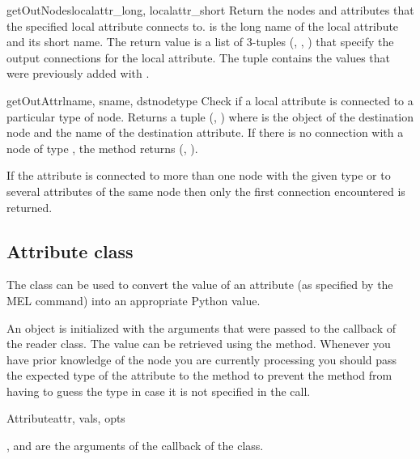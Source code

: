\begin{methoddesc}{getOutNodes}{localattr_long, localattr_short}
Return the nodes and attributes that the specified local attribute
connects to.  is the long name of the local
attribute and  its short name.
The return value is a list of 3-tuples (, , 
) that specify the output connections for the
local attribute. The tuple contains the values that were previously
added with .
\end{methoddesc}

\begin{methoddesc}{getOutAttr}{lname, sname, dstnodetype}
Check if a local attribute is connected to a particular type of node.
Returns a tuple (, ) where  is the
 object of the destination node and  the name of 
the destination attribute. If there is no connection with a node of
type , the method returns (, ).

If the attribute is connected to more than one node with the given
type or to several attributes of the same node then only the first
connection encountered is returned.
\end{methoddesc}

\subsection{Attribute class}

The  class can be used to convert the value of an
attribute (as specified by the  MEL command) into an
appropriate Python value.

An  object is initialized with the arguments that
were passed to the  callback of the reader
class. The value can be retrieved using the 
method. Whenever you have prior knowledge of the node you are 
currently processing you should pass the expected type of the
attribute to the  method to prevent the
method from having to guess the type in case it is not specified
in the  call.

\begin{classdesc}{Attribute}{attr, vals, opts}

,  and  are the arguments of the 
 callback of the  class.

\end{classdesc}

